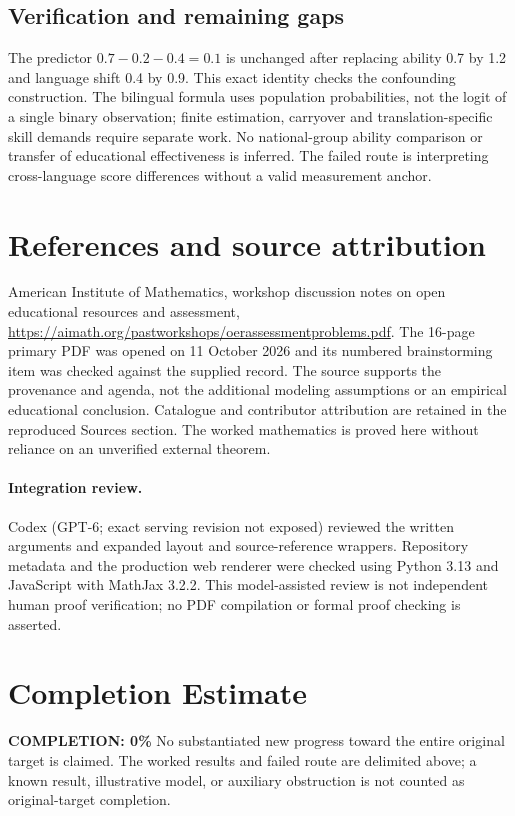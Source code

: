 \documentclass[11pt]{article}
\begin{document}
\subsection{Verification and remaining gaps}
The predictor $0.7-0.2-0.4=0.1$ is unchanged after replacing ability 0.7 by 1.2 and language shift 0.4 by 0.9. This exact identity checks the confounding construction. The bilingual formula uses population probabilities, not the logit of a single binary observation; finite estimation, carryover and translation-specific skill demands require separate work. No national-group ability comparison or transfer of educational effectiveness is inferred. The failed route is interpreting cross-language score differences without a valid measurement anchor.

\section{References and source attribution}
American Institute of Mathematics, workshop discussion notes on open educational resources and assessment, \url{https://aimath.org/pastworkshops/oerassessmentproblems.pdf}. The 16-page primary PDF was opened on 11 October 2026 and its numbered brainstorming item was checked against the supplied record. The source supports the provenance and agenda, not the additional modeling assumptions or an empirical educational conclusion. Catalogue and contributor attribution are retained in the reproduced Sources section. The worked mathematics is proved here without reliance on an unverified external theorem.


\paragraph{Integration review.} Codex (GPT-6; exact serving revision not exposed) reviewed the written arguments and expanded layout and source-reference wrappers. Repository metadata and the production web renderer were checked using Python 3.13 and JavaScript with MathJax 3.2.2. This model-assisted review is not independent human proof verification; no PDF compilation or formal proof checking is asserted.

\section{Completion Estimate}
\noindent\textbf{COMPLETION: 0\%}
No substantiated new progress toward the entire original target is claimed. The worked results and failed route are delimited above; a known result, illustrative model, or auxiliary obstruction is not counted as original-target completion.
\end{document}
